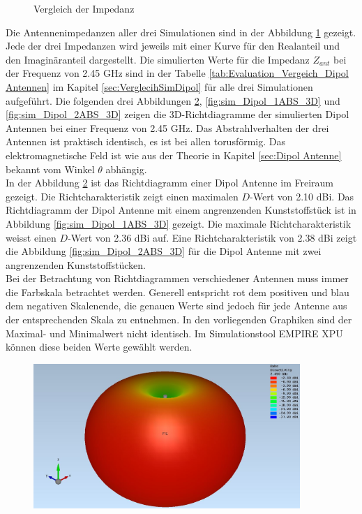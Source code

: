 \begin{figure}[!ht]
	\centering
	\begingroup
	
	\endgroup
	\caption{Vergleich der Impedanz}
	\label{Impedanz_Vergleich_Simulation}
\end{figure}
\newpage
Die Antennenimpedanzen aller drei Simulationen sind in der Abbildung \ref{Impedanz_Vergleich_Simulation} gezeigt. Jede der drei Impedanzen wird jeweils mit einer Kurve für den Realanteil und den Imaginäranteil dargestellt. Die simulierten Werte für die Impedanz $Z_{ant}$ bei der Frequenz von 2.45 GHz sind in der Tabelle \ref{tab:Evaluation_Vergeich_Dipol Antennen} im Kapitel \ref{sec:VerglecihSimDipol} für alle drei Simulationen aufgeführt.
\clearpage
\newpage
%
Die folgenden drei Abbildungen \ref{fig:sim_Dipol_Freiraum_3D},
\ref{fig:sim_Dipol_1ABS_3D} und 
\ref{fig:sim_Dipol_2ABS_3D} zeigen die 3D-Richtdiagramme der simulierten Dipol Antennen bei einer Frequenz von 2.45 GHz. Das Abstrahlverhalten der drei Antennen ist praktisch identisch, es ist bei allen torusförmig. Das elektromagnetische Feld ist wie aus der Theorie in Kapitel \ref{sec:Dipol Antenne} bekannt vom Winkel $\theta$ abhängig.\\
In der Abbildung \ref{fig:sim_Dipol_Freiraum_3D} ist das Richtdiagramm einer Dipol Antenne im Freiraum gezeigt. Die Richtcharakteristik zeigt einen maximalen $D$-Wert von 2.10 dBi. Das Richtdiagramm der Dipol Antenne mit einem angrenzenden Kunststoffstück ist in Abbildung \ref{fig:sim_Dipol_1ABS_3D} gezeigt. Die maximale Richtcharakteristik weisst einen $D$-Wert von 2.36 dBi auf. Eine Richtcharakteristik von 2.38 dBi zeigt die Abbildung \ref{fig:sim_Dipol_2ABS_3D} für die Dipol Antenne mit zwei angrenzenden Kunststoffstücken.\\
Bei der Betrachtung von Richtdiagrammen verschiedener Antennen muss immer die Farbskala betrachtet werden. Generell entspricht rot dem positiven und blau dem negativen Skalenende, die genauen Werte sind jedoch für jede Antenne aus der entsprechenden Skala zu entnehmen. In den vorliegenden Graphiken sind der Maximal- und Minimalwert nicht identisch. Im Simulationstool EMPIRE XPU können diese beiden Werte gewählt werden. 
\begin{figure}[h]
	\begin{center}
		\includegraphics[width=0.9\textwidth]{content/bilder/Evaluation/Dipol/3D_Dipol_Freiraum.JPG}
		\label{fig:sim_Dipol_Freiraum_3D}
	\end{center}
\end{figure}
